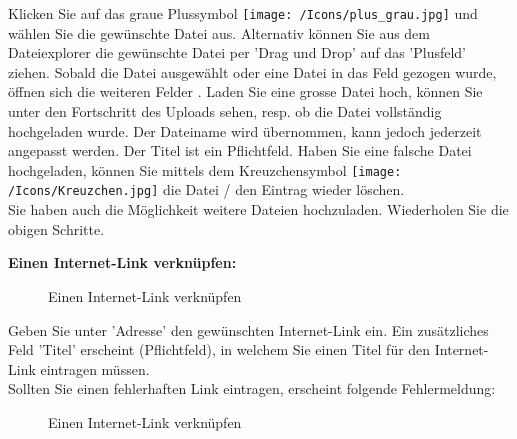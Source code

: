 Klicken Sie auf das graue Plussymbol \texttt{[image: /Icons/plus\_grau.jpg]}  und wählen Sie die gewünschte Datei aus. Alternativ können Sie aus dem Dateiexplorer die gewünschte Datei per 'Drag und Drop' auf das 'Plusfeld' ziehen. Sobald die Datei ausgewählt oder eine Datei in das Feld gezogen wurde, öffnen sich die weiteren Felder . Laden Sie eine grosse Datei hoch, können Sie unter  den Fortschritt des Uploads sehen, resp. ob die Datei vollständig hochgeladen wurde. Der Dateiname  wird übernommen, kann jedoch jederzeit angepasst werden. Der Titel ist ein Pflichtfeld. Haben Sie eine falsche Datei hochgeladen, können Sie mittels dem Kreuzchensymbol \texttt{[image: /Icons/Kreuzchen.jpg]}  die Datei / den Eintrag wieder löschen. \\
Sie haben auch die Möglichkeit weitere Dateien hochzuladen. Wiederholen Sie die obigen Schritte.

\vspace{\baselineskip}

\textbf{Einen Internet-Link verknüpfen:} 
\begin{figure}[H]
\caption{Einen Internet-Link verknüpfen}
\end{figure}

Geben Sie unter 'Adresse'  den gewünschten Internet-Link ein. Ein zusätzliches Feld 'Titel'  erscheint (Pflichtfeld), in welchem Sie einen Titel für den Internet-Link eintragen müssen.\\

Sollten Sie einen fehlerhaften Link eintragen, erscheint folgende Fehlermeldung:

\begin{figure}[H]
\caption{Einen Internet-Link verknüpfen}
\end{figure}


